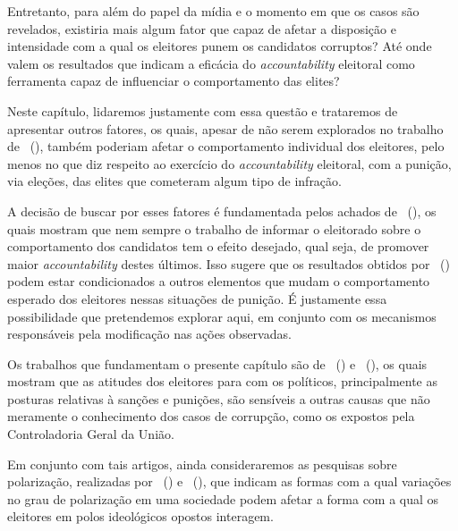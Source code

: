 \documentclass[
	12pt,				%
	openright,			%
	twoside,			%
	a4paper,			%
	openany,
	english,			%
	brazil				%
	]{abntex2}
\begin{document}
Entretanto, para além do papel da mídia e o momento em que os casos são revelados, existiria mais algum fator que capaz de afetar a disposição e intensidade com a qual os eleitores punem os candidatos corruptos? Até onde valem os resultados que indicam a eficácia do \textit{accountability} eleitoral como ferramenta capaz de influenciar o comportamento das elites?

Neste capítulo, lidaremos justamente com essa questão e trataremos de apresentar outros fatores, os quais, apesar de não serem explorados no trabalho de ~(\citeyear{ferraz2008exposing}), também poderiam afetar o comportamento individual dos eleitores, pelo menos no que diz respeito ao exercício do \textit{accountability} eleitoral, com a punição, via eleções, das elites que cometeram algum tipo de infração.

A decisão de buscar por esses fatores é fundamentada pelos achados de ~(\citeyear{dunning2019voter}), os quais mostram que nem sempre o trabalho de informar o eleitorado sobre o comportamento dos candidatos tem o efeito desejado, qual seja, de promover maior \textit{accountability} destes últimos. Isso sugere que os resultados obtidos por ~(\citeyear{ferraz2008exposing}) podem estar condicionados a outros elementos que mudam o comportamento esperado dos eleitores nessas situações de punição. É justamente essa possibilidade que pretendemos explorar aqui, em conjunto com os mecanismos responsáveis pela modificação nas ações observadas.

Os trabalhos que fundamentam o presente capítulo são de ~(\citeyear{Boas2019Apr}) e ~(\citeyear{Botero2021Apr}), os quais mostram que as atitudes dos eleitores para com os políticos, principalmente as posturas relativas à sanções e punições, são sensíveis a outras causas que não meramente o conhecimento dos casos de corrupção, como os expostos pela Controladoria Geral da União.

Em conjunto com tais artigos, ainda consideraremos as pesquisas sobre polarização, realizadas por ~(\citeyear{fuks2020afeto}) e ~(\citeyear{Bednar2021Dec}), que indicam as formas com a qual variações no grau de polarização em uma sociedade podem afetar a forma com a qual os eleitores em polos ideológicos opostos interagem.

\end{document}
